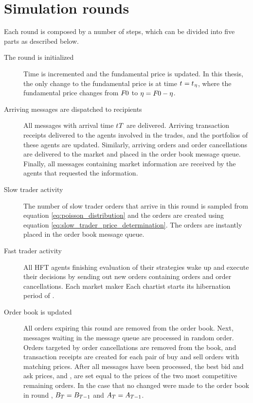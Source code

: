 \section{Simulation rounds}
Each round is composed by a number of steps, which can be divided into five parts as described below.

\begin{description}
\item[The round is initialized] Time is incremented and the fundamental price is updated. In this thesis, the only change to the fundamental price is at time $t_{} = t_{}{_\eta}$, where the fundamental price changes from $F_{}{0}$ to $\eta = F_{}{0} - \eta$.
\item[Arriving messages are dispatched to recipients] All messages with arrival time $t_{}{T}$ are delivered. Arriving transaction receipts delivered to the agents involved in the trades, and the portfolios of these agents are updated. Similarly, arriving orders and order cancellations are delivered to the market and placed in the order book message queue. Finally, all messages containing market information are received by the agents that requested the information. 
\item[Slow trader activity] The number of slow trader orders that arrive in this round is sampled from equation \ref{eq:poisson_distribution} and the orders are created using equation \ref{eq:slow_trader_price_determination}. The orders are instantly placed in the order book message queue.
\item[Fast trader activity] All HFT agents finishing evaluation of their strategies wake up and execute their decisions by sending out new orders containing orders and order cancellations. Each market maker  Each chartist  starts its hibernation period of .
\item[Order book is updated] All orders expiring this round are removed from the order book. Next, messages waiting in the message queue are processed in random order. Orders targeted by order cancellations are removed from the book, and transaction receipts are created for each pair of buy and sell orders with matching prices. After all messages have been processed, the best bid and ask prices,  and , are set equal to the prices of the two most competitive remaining orders. In the case that no changed were made to the order book in round , $B_{T} = B_{T-1}$ and $A_{T} = A_{T-1}$.
\end{description}









